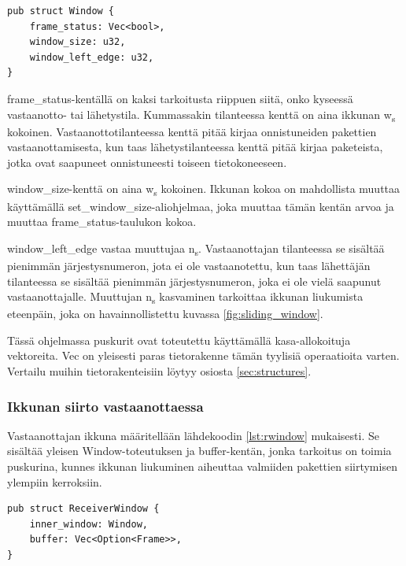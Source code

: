 \documentclass[a4paper,12pt]{article}
\begin{document}
    
\begin{lstlisting}[caption={Ikkunan rakenne}, label={lst:window}]
pub struct Window {
    frame_status: Vec<bool>,
    window_size: u32,
    window_left_edge: u32,
}\end{lstlisting}

frame\_status-kentällä on kaksi tarkoitusta riippuen siitä, onko kyseessä vastaanotto- tai lähetystila. Kummassakin tilanteessa kenttä on aina ikkunan w\textsubscript{s} kokoinen. Vastaanottotilanteessa kenttä pitää kirjaa onnistuneiden pakettien vastaanottamisesta, kun taas lähetystilanteessa kenttä pitää kirjaa paketeista, jotka ovat saapuneet onnistuneesti toiseen tietokoneeseen.\par

window\_size-kenttä on aina w\textsubscript{s} kokoinen. Ikkunan kokoa on mahdollista muuttaa käyttämällä set\_window\_size-aliohjelmaa, joka muuttaa tämän kentän arvoa ja muuttaa frame\_status-taulukon kokoa.\par

window\_left\_edge vastaa muuttujaa n\textsubscript{s}. Vastaanottajan tilanteessa se sisältää pienimmän järjestysnumeron, jota ei ole vastaanotettu, kun taas lähettäjän tilanteessa se sisältää pienimmän järjestysnumeron, joka ei ole vielä saapunut vastaanottajalle. Muuttujan n\textsubscript{s} kasvaminen tarkoittaa ikkunan liukumista eteenpäin, joka on havainnollistettu kuvassa \ref{fig:sliding_window}. 

    \slidingWindow
    
    Tässä ohjelmassa puskurit ovat toteutettu käyttämällä kasa-allokoituja vektoreita. Vec on yleisesti paras tietorakenne tämän tyylisiä operaatioita varten. Vertailu muihin tietorakenteisiin löytyy osiosta \ref{sec:structures}.

\newpage

    \subsubsection*{Ikkunan siirto vastaanottaessa}

    Vastaanottajan ikkuna määritellään lähdekoodin \ref{lst:rwindow} mukaisesti. Se sisältää yleisen Window-toteutuksen ja buffer-kentän, jonka tarkoitus on toimia puskurina, kunnes ikkunan liukuminen aiheuttaa valmiiden pakettien siirtymisen ylempiin kerroksiin. \par
    
\begin{lstlisting}[caption={Vastaanottajan ikkunan rakenne}, label={lst:rwindow}]
pub struct ReceiverWindow {
    inner_window: Window,
    buffer: Vec<Option<Frame>>,
}\end{lstlisting}
\end{document}
